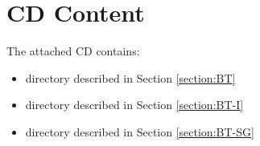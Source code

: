 





\chapter{CD Content}

The attached CD contains:
\begin{itemize}
    \item {} directory described in Section \ref{section:BT}
    \item {} directory described in Section \ref{section:BT-I}
    \item {} directory described in Section \ref{section:BT-SG}
\end{itemize}


